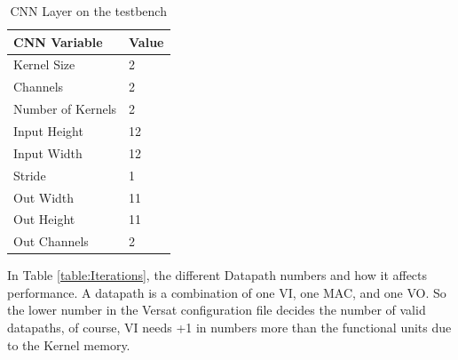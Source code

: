 \documentclass[conference]{IEEEtran}
\begin{document}
\begin{table}[!htpb]
    \centering
    \begin{tabular}{ll}
    \hline
    \textbf{CNN Variable} & \textbf{Value}        \\ \hline
    Kernel Size            & 2                 \\
    Channels            & 2                       \\
    Number of Kernels            & 2                       \\
    Input Height                  & 12                        \\
    Input Width                & 12                  \\
    Stride              & 1                     \\
    Out Width               & 11                      \\
    Out Height            & 11  \\
    Out Channels                   & 2                     \\ \hline
    \end{tabular}
    \label{table:convInput}
    \linebreak
    \caption{CNN Layer on the testbench}
\end{table}



In Table \ref{table:Iterations}, the different Datapath numbers and how it affects performance.
A datapath is a combination of one VI, one MAC, and one VO. So the lower number in the Versat configuration file
decides the number of valid datapaths, of course, VI needs +1 in numbers more than the functional units due to the Kernel memory.
\end{document}

